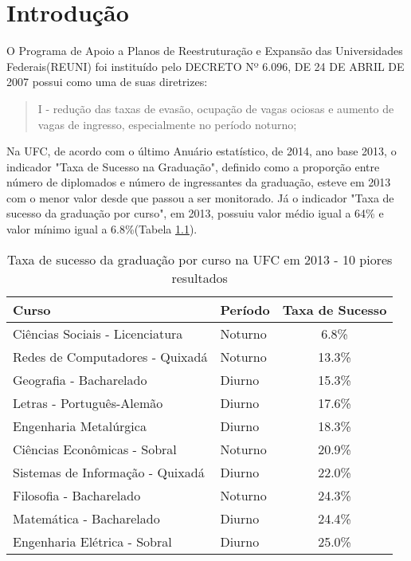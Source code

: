 \chapter{Introdução}

O Programa de Apoio a Planos de Reestruturação e Expansão das Universidades Federais(REUNI) foi instituído pelo DECRETO Nº 6.096, DE 24 DE ABRIL DE 2007  possui como uma de suas diretrizes:

\begin{quote}
I - redução das taxas de evasão, ocupação de vagas ociosas e aumento de vagas de ingresso, especialmente no período noturno;
\end{quote}

Na UFC, de acordo com o último Anuário estatístico, de 2014, ano base 2013, o indicador "Taxa de Sucesso na Graduação", definido como a proporção entre número de diplomados e número de ingressantes da graduação, esteve em 2013 com o menor valor desde que passou a ser monitorado. Já o indicador "Taxa de sucesso da graduação por curso", em 2013, possuiu valor médio igual a 64\% e valor mínimo igual a 6.8\%(Tabela \ref{table:ts_2013}).

\begin{table}
\begin{tabular}{llc}
\toprule
                            Curso &  Período & Taxa de Sucesso \\
\midrule
  Ciências Sociais - Licenciatura &  Noturno &            6.8\% \\
  Redes de Computadores - Quixadá &  Noturno &           13.3\% \\
          Geografia - Bacharelado &   Diurno &           15.3\% \\
        Letras - Português-Alemão &   Diurno &           17.6\% \\
           Engenharia Metalúrgica &   Diurno &           18.3\% \\
     Ciências Econômicas - Sobral &  Noturno &           20.9\% \\
 Sistemas de Informação - Quixadá &   Diurno &           22.0\% \\
          Filosofia - Bacharelado &  Noturno &           24.3\% \\
         Matemática - Bacharelado &   Diurno &           24.4\% \\
     Engenharia Elétrica - Sobral &   Diurno &           25.0\% \\
\bottomrule
\end{tabular}
\caption{Taxa de sucesso da graduação por curso na UFC em 2013 - 10 piores resultados}
\label{table:ts_2013}
\end{table}


